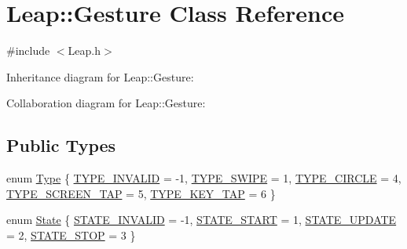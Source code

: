 \hypertarget{class_leap_1_1_gesture}{}\section{Leap\+:\+:Gesture Class Reference}
\label{class_leap_1_1_gesture}


{\ttfamily \#include $<$Leap.\+h$>$}



Inheritance diagram for Leap\+:\+:Gesture\+:


Collaboration diagram for Leap\+:\+:Gesture\+:
\subsection*{Public Types}
\begin{DoxyCompactItemize}
\item 
enum \hyperlink{class_leap_1_1_gesture_a6fa6dd4f28c502f0d55abc6b71c6f9b1}{Type} \{ \newline
\hyperlink{class_leap_1_1_gesture_a6fa6dd4f28c502f0d55abc6b71c6f9b1a743fdf6ff0a893a5b7bf6a56739af618}{T\+Y\+P\+E\+\_\+\+I\+N\+V\+A\+L\+ID} = -\/1, 
\hyperlink{class_leap_1_1_gesture_a6fa6dd4f28c502f0d55abc6b71c6f9b1a0845a054bc76e298900d3bd735d26c9c}{T\+Y\+P\+E\+\_\+\+S\+W\+I\+PE} = 1, 
\hyperlink{class_leap_1_1_gesture_a6fa6dd4f28c502f0d55abc6b71c6f9b1a32c2a26d674d97f9c9b2e72569ff6869}{T\+Y\+P\+E\+\_\+\+C\+I\+R\+C\+LE} = 4, 
\hyperlink{class_leap_1_1_gesture_a6fa6dd4f28c502f0d55abc6b71c6f9b1aa099d1aa238c369e5b2519f2aaca2218}{T\+Y\+P\+E\+\_\+\+S\+C\+R\+E\+E\+N\+\_\+\+T\+AP} = 5, 
\newline
\hyperlink{class_leap_1_1_gesture_a6fa6dd4f28c502f0d55abc6b71c6f9b1a4db232d45dfde82ff0c319f623cc3471}{T\+Y\+P\+E\+\_\+\+K\+E\+Y\+\_\+\+T\+AP} = 6
 \}
\item 
enum \hyperlink{class_leap_1_1_gesture_a068c6f3ba05970dc557b62a366073578}{State} \{ \hyperlink{class_leap_1_1_gesture_a068c6f3ba05970dc557b62a366073578a6a15c3a18402c69bd711b58e6dea5d93}{S\+T\+A\+T\+E\+\_\+\+I\+N\+V\+A\+L\+ID} = -\/1, 
\hyperlink{class_leap_1_1_gesture_a068c6f3ba05970dc557b62a366073578aae7d6cacedcd2850cdea7d9f2dfd33a4}{S\+T\+A\+T\+E\+\_\+\+S\+T\+A\+RT} = 1, 
\hyperlink{class_leap_1_1_gesture_a068c6f3ba05970dc557b62a366073578ac8600576e553a806c9c4a337e5cee473}{S\+T\+A\+T\+E\+\_\+\+U\+P\+D\+A\+TE} = 2, 
\hyperlink{class_leap_1_1_gesture_a068c6f3ba05970dc557b62a366073578a4cfb4482ef179e4527c15188328b894f}{S\+T\+A\+T\+E\+\_\+\+S\+T\+OP} = 3
 \}
\end{DoxyCompactItemize}
